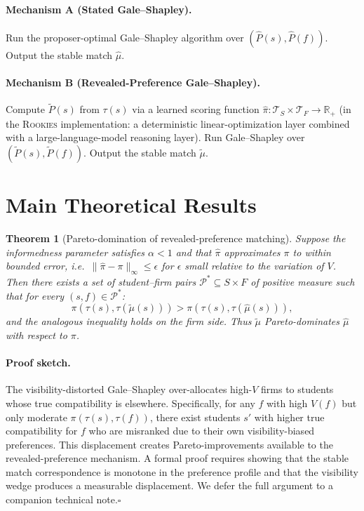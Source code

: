 \documentclass[11pt,a4paper]{article}
\newtheorem{theorem}{Theorem}
\newcommand{\R}{\mathbb{R}}
\newcommand{\TT}{\mathcal{T}}
\begin{document}
\paragraph{Mechanism A (Stated Gale--Shapley).} Run the proposer-optimal Gale--Shapley algorithm over $(\widehat{P}(s),\widehat{P}(f))$. Output the stable match $\widehat{\mu}$.

\paragraph{Mechanism B (Revealed-Preference Gale--Shapley).} Compute $\widetilde{P}(s)$ from $\tau(s)$ via a learned scoring function $\widehat{\pi}: \TT_S \times \TT_F \to \R_+$ (in the \textsc{Rookies} implementation: a deterministic linear-optimization layer combined with a large-language-model reasoning layer). Run Gale--Shapley over $(\widetilde{P}(s),\widetilde{P}(f))$. Output the stable match $\widetilde{\mu}$.

\section{Main Theoretical Results}
\label{sec:results}

\begin{theorem}[Pareto-domination of revealed-preference matching]
\label{thm:pareto}
Suppose the informedness parameter satisfies $\alpha < 1$ and that $\widehat{\pi}$ approximates $\pi$ to within bounded error, i.e.\ $\|\widehat{\pi} - \pi\|_\infty \leq \epsilon$ for $\epsilon$ small relative to the variation of $V$. Then there exists a set of student--firm pairs $\mathcal{P}^* \subseteq S \times F$ of positive measure such that for every $(s,f) \in \mathcal{P}^*$:
\[
    \pi(\tau(s),\tau(\widetilde{\mu}(s))) > \pi(\tau(s),\tau(\widehat{\mu}(s))),
\]
and the analogous inequality holds on the firm side. Thus $\widetilde{\mu}$ Pareto-dominates $\widehat{\mu}$ with respect to $\pi$.
\end{theorem}

\paragraph{Proof sketch.} The visibility-distorted Gale--Shapley over-allocates high-$V$ firms to students whose true compatibility is elsewhere. Specifically, for any $f$ with high $V(f)$ but only moderate $\pi(\tau(s),\tau(f))$, there exist students $s'$ with higher true compatibility for $f$ who are misranked due to their own visibility-biased preferences. This displacement creates Pareto-improvements available to the revealed-preference mechanism. A formal proof requires showing that the stable match correspondence is monotone in the preference profile and that the visibility wedge produces a measurable displacement. We defer the full argument to a companion technical note.\hfill$\square$
\end{document}
